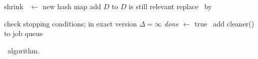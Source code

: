 \begin{algorithm*}[tbh]
\begin{multicols}{2}
\begin{algorithmic}[1]
\Statex
{} \label{l:clean-start}
\If{$|\DMap | > \Phi $} 
 \Comment shrink \DMap 
\State \LDMap\ $\leftarrow$ new hash map \label{l:clean-local-copy}
{} 
	\State add   $D$ to \LDMap \Comment $D$ is still relevant
\EndIf
\EndFor
\State replace \DMap\ by \LDMap \label{l:clean-replace}
\EndIf

\Statex \Comment check stopping conditions; in exact version $\Delta=\infty$
 \label{l:clean-stop-cond}
\State 
\emph{done} $\leftarrow$ true
\Else\ add {\sc cleaner()} to job queue
\EndIf
\label{l:clean-end}
\EndProcedure 
\end{algorithmic}
\end{multicols}
\caption{\alg\ algorithm.}
\label{alg:sparta}
\end{algorithm*}